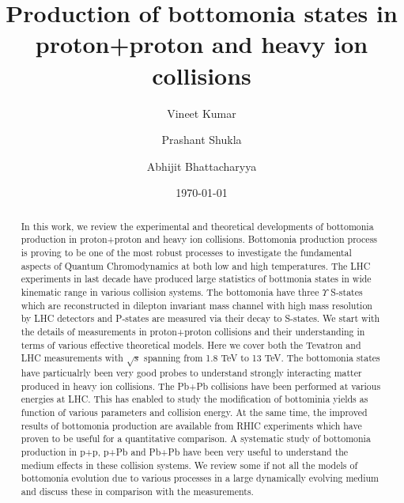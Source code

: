 \documentclass[review]{elsarticle}
\begin{document}
  \title{Production of bottomonia states in proton+proton and heavy ion collisions}
  \author[NPD]{Vineet Kumar}
  \author[NPD,HBNI]{Prashant Shukla}
  \author[UOC]{Abhijit Bhattacharyya}
  \address[NPD]{Nuclear Physics Division, Bhabha Atomic Research Centre, Mumbai 400085, India}
  \address[HBNI]{Homi Bhabha National Institute, Anushakti Nagar, Mumbai 400094, India}
  \address[UOC]{Department of Physics, University of Calcutta, 92, A. P. C. Road Kolkata-700009, India}
  \date{\today}
\fontsize{11}{15}
\selectfont
  
\begin{abstract}
    
 In this work, we review the experimental and theoretical developments of bottomonia
production in proton+proton and heavy ion collisions. Bottomonia production
process is proving to be one of the most robust processes to investigate the
fundamental aspects of Quantum Chromodynamics at both low and high temperatures.  
The LHC experiments in last decade have produced large statistics of
bottmonia states in wide kinematic range in various collision
systems. The bottomonia have three $\Upsilon$ S-states which are
reconstructed in dilepton invariant mass channel with high mass resolution by
LHC detectors and P-states are measured via their decay to S-states. 
We start with the details of measurements in proton+proton collisions and their
understanding in terms of various effective theoretical models. Here we cover both the
Tevatron and LHC measurements with $\sqrt{s}$ spanning from 1.8 TeV to 13 TeV. 
  The bottomonia states have particualrly been very good probes to understand
strongly interacting matter produced in heavy ion collisions. The Pb+Pb
collisions have been performed at various energies at LHC. This has enabled to
study the modification of bottominia yields as function of various parameters
and collision energy. At the same time, the improved results of bottomonia
production are available from RHIC experiments which have proven to be useful
for a quantitative comparison. 
 A systematic study of bottomonia production in p+p,
p+Pb and Pb+Pb have been very useful to understand the medium effects
in these collision systems. We review some if not all the models of bottomonia
evolution due to various processes in a large dynamically evolving medium and
discuss these in comparison with the measurements. 
\end{abstract}
  
\end{document}
